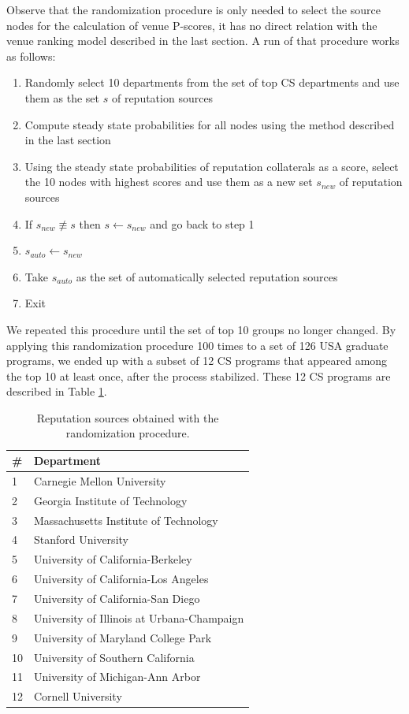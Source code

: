 \documentclass[notitlepage]{svjour3}
\begin{document}
Observe that the randomization procedure is only needed to
select the source nodes for the calculation of venue P-scores, it has no direct relation with the venue ranking
model described in the last section. A run of that procedure works as follows: 
\begin{enumerate}
\item Randomly select 10 departments from the set of top CS departments and use them as the set $s$ of reputation sources
\item Compute steady state probabilities for all nodes using the method described in the last section
\item Using the steady state probabilities of reputation collaterals as a score, select the 10 nodes with 
highest scores and use them as a new set $s_{new}$ of reputation sources
\item If $s_{new} \not \equiv s$ then $s \leftarrow s_{new}$ and go back to step 1
\item $s_{auto} \leftarrow s_{new}$ 
\item Take $s_{auto}$ as the set of automatically selected reputation sources
\item Exit
\end{enumerate}

We repeated this procedure until the set of top 10 groups no longer changed.
By applying this randomization procedure 100 times to a set of 126 USA graduate programs, 
we ended up with a subset of 12 CS programs that appeared 
among the top 10 at least once, after the process stabilized. These 12 CS programs are
described in Table \ref{tab:departments}.

\begin{table}[ht!]
 \centering
 \begin{tabular}{l l} 
 \toprule
 \# & Department \\ 
 \midrule
 1  & Carnegie Mellon University \\
 2  & Georgia Institute of Technology \\
 3  & Massachusetts Institute of Technology \\
 4  & Stanford University \\
 5  & University of California-Berkeley \\
 6  & University of California-Los Angeles \\
 7  & University of California-San Diego \\
 8  & University of Illinois at Urbana-Champaign \\
 9  & University of Maryland College Park \\
 10 & University of Southern California \\
 11 & University of Michigan-Ann Arbor \\
 12 & Cornell University \\
 \bottomrule
 \end{tabular}
 \caption{Reputation sources obtained with the randomization procedure.}
 \label{tab:departments}
\end{table}
\end{document}
